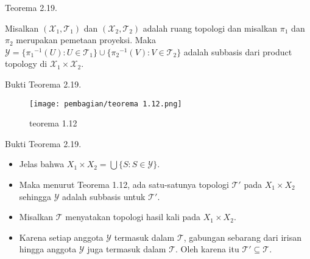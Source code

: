     
    \begin{frame}{Teorema 2.19.}
    \begin{tcolorbox}[title=Teorema 2.19]
        Misalkan $(\mathcal{X}_1, \mathcal{T}_1)$ dan $(\mathcal{X}_2, \mathcal{T}_2)$ adalah ruang topologi dan misalkan $\pi_1$ dan $\pi_2$ merupakan pemetaan proyeksi. Maka $\mathcal{Y} = \{ {\pi_1}^{-1} (U) : U \in \mathcal{T}_1\} \cup \{ {\pi_2}^{-1}(V) : V \in \mathcal{T}_2 \}$ adalah subbasis dari product topology di $\mathcal{X}_1 \times \mathcal{X}_2$.
    \end{tcolorbox}
    \end{frame}
    
    \begin{frame}{Bukti Teorema 2.19.}
    \begin{figure}
        \centering
        \texttt{[image: pembagian/teorema 1.12.png]}
        \caption{teorema 1.12}
        \label{fig:enter-label}
    \end{figure}
        
    \end{frame}
    
    \begin{frame}{Bukti Teorema 2.19.}
    \begin{tcolorbox}[title=Bukti Teorema 2.19 (1/2)]
    \begin{itemize}
        \item Jelas bahwa $X_1 \times X_2 = \bigcup \{S : S \in \mathcal{Y}\}$. 
        \item Maka menurut Teorema 1.12, ada satu-satunya topologi $\mathcal{T}'$ pada $X_1 \times X_2$ sehingga $\mathcal{Y}$ adalah subbasis untuk $\mathcal{T}'$. 
        \item Misalkan $\mathcal{T}$ menyatakan topologi hasil kali pada $X_1 \times X_2$. \item Karena setiap anggota $\mathcal{Y}$ termasuk dalam $\mathcal{T}$, gabungan sebarang dari irisan hingga anggota $\mathcal{Y}$ juga termasuk dalam $\mathcal{T}$. Oleh karena itu $\mathcal{T}' \subseteq \mathcal{T}$.
        
    \end{itemize}
        
    \end{tcolorbox}
    \end{frame}
    
